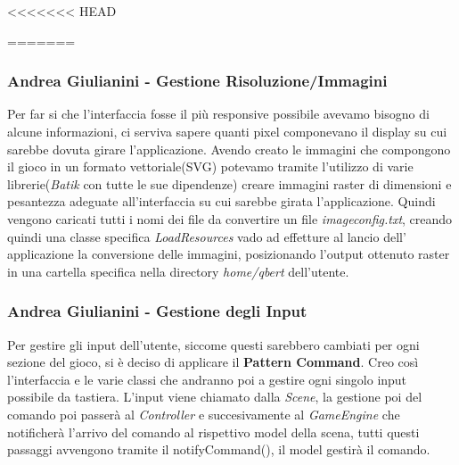 \documentclass[a4paper,12pt, hidelinks]{report}
\begin{document}
<<<<<<< HEAD

=======
\begin{flushright}
\item\subsubsection{Andrea Giulianini - Gestione Risoluzione/Immagini}
\end{flushright}

Per far si che l'interfaccia fosse il più responsive possibile avevamo bisogno di alcune informazioni, ci serviva sapere quanti pixel componevano il display su cui sarebbe dovuta girare l'applicazione.
Avendo creato le immagini che compongono il gioco in un formato vettoriale(SVG) potevamo tramite l'utilizzo di varie librerie(\emph{Batik} con tutte le sue dipendenze) creare immagini raster di dimensioni e pesantezza adeguate all'interfaccia su cui sarebbe girata l'applicazione. Quindi vengono caricati tutti i nomi dei file da convertire un file \emph{imageconfig.txt}, creando quindi una classe specifica \emph{LoadResources} vado ad effetture al lancio dell' applicazione la conversione delle immagini, posizionando l'output ottenuto raster in una cartella specifica nella directory \emph{home/qbert} dell'utente.

\begin{flushright}
\item\subsubsection{Andrea Giulianini - Gestione degli Input}
\end{flushright}

Per gestire gli input dell'utente, siccome questi sarebbero cambiati per ogni sezione del gioco, si è deciso di applicare il \textbf{Pattern Command}. Creo così l'interfaccia e le varie classi che andranno poi a gestire ogni singolo input possibile da tastiera. L'input viene chiamato dalla \emph{Scene}, la gestione poi del comando poi passerà al \emph{Controller} e succesivamente al \emph{GameEngine} che notificherà l'arrivo del comando al rispettivo model della scena, tutti questi passaggi avvengono tramite il notifyCommand(), il model gestirà il comando.
\end{document}
